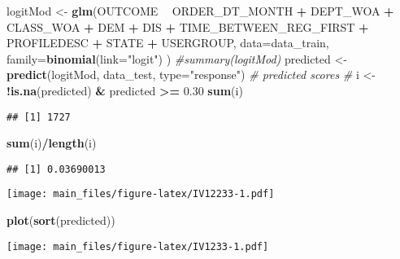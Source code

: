 \documentclass[
]{article}
\newenvironment{Shaded}{\begin{snugshade}}{\end{snugshade}}
\newcommand{\CommentTok}[1]{\textcolor[rgb]{0.56,0.35,0.01}{\textit{#1}}}
\newcommand{\DataTypeTok}[1]{\textcolor[rgb]{0.13,0.29,0.53}{#1}}
\newcommand{\FloatTok}[1]{\textcolor[rgb]{0.00,0.00,0.81}{#1}}
\newcommand{\KeywordTok}[1]{\textcolor[rgb]{0.13,0.29,0.53}{\textbf{#1}}}
\newcommand{\NormalTok}[1]{#1}
\newcommand{\OperatorTok}[1]{\textcolor[rgb]{0.81,0.36,0.00}{\textbf{#1}}}
\newcommand{\StringTok}[1]{\textcolor[rgb]{0.31,0.60,0.02}{#1}}
\begin{document}
\begin{Shaded}
\begin{Highlighting}[]
\NormalTok{logitMod <-}\StringTok{ }\KeywordTok{glm}\NormalTok{(OUTCOME }\OperatorTok{~}\StringTok{ }\NormalTok{ORDER_DT_MONTH }\OperatorTok{+}\StringTok{ }
\StringTok{                          }\NormalTok{DEPT_WOA }\OperatorTok{+}
\StringTok{                          }\NormalTok{CLASS_WOA }\OperatorTok{+}
\StringTok{                          }\NormalTok{DEM }\OperatorTok{+}\StringTok{ }
\StringTok{                          }\NormalTok{DIS }\OperatorTok{+}
\StringTok{                          }\NormalTok{TIME_BETWEEN_REG_FIRST }\OperatorTok{+}
\StringTok{                          }\NormalTok{PROFILEDESC }\OperatorTok{+}
\StringTok{                          }\NormalTok{STATE }\OperatorTok{+}
\StringTok{                          }\NormalTok{USERGROUP, }
                \DataTypeTok{data=}\NormalTok{data_train, }
                \DataTypeTok{family=}\KeywordTok{binomial}\NormalTok{(}\DataTypeTok{link=}\StringTok{"logit"}\NormalTok{)}
\NormalTok{                )}
\CommentTok{#summary(logitMod)}
\NormalTok{predicted <-}\StringTok{ }\KeywordTok{predict}\NormalTok{(logitMod, data_test, }\DataTypeTok{type=}\StringTok{"response"}\NormalTok{)  }\CommentTok{# predicted scores}
\CommentTok{#}
\NormalTok{i <-}\StringTok{ }\OperatorTok{!}\KeywordTok{is.na}\NormalTok{(predicted) }\OperatorTok{&}\StringTok{ }\NormalTok{predicted }\OperatorTok{>=}\StringTok{ }\FloatTok{0.30}
\KeywordTok{sum}\NormalTok{(i)}
\end{Highlighting}
\end{Shaded}

\begin{verbatim}
## [1] 1727
\end{verbatim}

\begin{Shaded}
\begin{Highlighting}[]
\KeywordTok{sum}\NormalTok{(i)}\OperatorTok{/}\KeywordTok{length}\NormalTok{(i)}
\end{Highlighting}
\end{Shaded}

\begin{verbatim}
## [1] 0.03690013
\end{verbatim}

\begin{Shaded}
\end{Shaded}

\texttt{[image: main\_files/figure-latex/IV12233-1.pdf]}

\begin{Shaded}
\begin{Highlighting}[]
\KeywordTok{plot}\NormalTok{(}\KeywordTok{sort}\NormalTok{(predicted))}
\end{Highlighting}
\end{Shaded}

\texttt{[image: main\_files/figure-latex/IV1233-1.pdf]}
\end{document}
